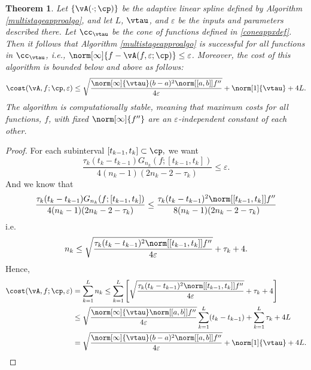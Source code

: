 \documentclass[]{elsarticle}
\newtheorem{theorem}{Theorem}
\theoremstyle{definition}
\theoremstyle{remark}
\begin{document}
\begin{theorem} \label{multistageappxthm}
Let $\{\vA(\cdot;\cp)\}$ be the adaptive linear spline defined by Algorithm \ref{multistageapproalgo}, and let $L$, $\vtau$, and $\varepsilon$ be the inputs and parameters described there. Let $\cc_{\vtau}$ be the cone of functions defined in \eqref{coneappxdef}.  Then it follows that Algorithm \ref{multistageapproalgo} is successful for all functions in $\cc_{\vtau}$,  i.e.,  $\norm[\infty]{f - \vA(f,\varepsilon;\cp)} \le \varepsilon$.  Moreover, the cost of this algorithm is bounded below and above as follows:
$$
\cost(\vA,f;\cp,\varepsilon) \le \sqrt{\frac{\norm[\infty]{\vtau}(b-a)^2\norm[{[a,b]}]{f''}}{4\varepsilon}}+\norm[1]{\vtau}+4L.$$
The algorithm is computationally stable, meaning that maximum costs for all functions, $f$, with fixed $\norm[\infty]{f''}$ are an $\varepsilon$-independent constant of each other.
\end{theorem}
\begin{proof}
For each subinterval $[t_{k-1},t_k] \subset \cp,$ we want
$$\frac{\tau_k(t_k-t_{k-1}) G_{n_k}(f;[t_{k-1},t_k]) } {4(n_k-1)(2n_k-2 -\tau_k)} \le \varepsilon.$$
And we know that 
$$\frac{\tau_k(t_k-t_{k-1}) G_{n_k}(f;[t_{k-1},t_k]) } {4(n_k-1)(2n_k-2 -\tau_k)} \le \frac{\tau_k(t_k-t_{k-1})^2 \norm[{[t_{k-1},t_k]}]{f''} }{8(n_k-1)(2n_k-2 -\tau_k)}$$ 
i.e.
$$n_k \le \sqrt{\frac{\tau_k (t_k-t_{k-1})^2\norm[{[t_{k-1},t_k]}]{f''} }{4\varepsilon}} + \tau_k + 4.$$
Hence,
\begin{align*}
\cost(\vA,f;\cp,\varepsilon)&=\sum\limits_{k=1}^{L}n_k \leq\sum\limits_{k=1}^{L}\left[\sqrt{\frac{\tau_k (t_k-t_{k-1})^2\norm[{[t_{k-1},t_k]}]{f''} }{4\varepsilon}} + \tau_k + 4\right]\\
& \leq  \sqrt{\frac{\norm[\infty]{\vtau}\norm[{[a,b]}]{f''} }{4\varepsilon}}\sum\limits_{k=1}^{L} (t_k-t_{k-1})+ \sum\limits_{k=1}^{L}\tau_k + 4L\\
& =\sqrt{\frac{\norm[\infty]{\vtau}(b-a)^2\norm[{[a,b]}]{f''}}{4\varepsilon}}+\norm[1]{\vtau}+4L.\\
\end{align*}
\end{proof}
\end{document}

